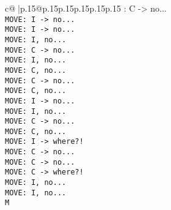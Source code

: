 \documentclass{article}
\begin{document}
{\begin{supertabular}{c@{$\;$}|p{.15\linewidth}@{}p{.15\linewidth}p{.15\linewidth}p{.15\linewidth}p{.15\linewidth}p{.15\linewidth}}
{{{: C -> no...\\ \tt  MOVE: I -> no...\\ \tt  MOVE: I -> no...\\ \tt  MOVE: I, no...\\ \tt  MOVE: C -> no...\\ \tt  MOVE: I, no...\\ \tt  MOVE: C, no...\\ \tt  MOVE: C -> no...\\ \tt  MOVE: C, no...\\ \tt  MOVE: I -> no...\\ \tt  MOVE: I, no...\\ \tt  MOVE: C -> no...\\ \tt  MOVE: C, no...\\ \tt  MOVE: I -> where?!\\ \tt  MOVE: C -> no...\\ \tt  MOVE: C -> no...\\ \tt  MOVE: C -> where?!\\ \tt  MOVE: I, no...\\ \tt  MOVE: I, no...\\ \tt  M}}}
\end{supertabular}}
\end{document}
